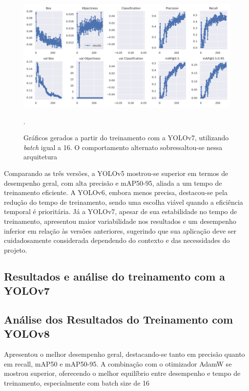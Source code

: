 \begin{figure}[!h]
    \centering
    \begin{minipage}{1\linewidth}
    \centering
    \captionsetup{justification=centering,margin=0.5cm,font=small}
    \includegraphics[width=1\linewidth]{img/cap6/results-yolov7-batch-16.png}
    \caption{Gráficos gerados a partir do treinamento com a YOLOv7, utilizando \textit{batch} igual a 16. O comportamento alternato sobressaltou-se nessa arquitetura}.
    \label{fig:yolov5batch16}
    \end{minipage}
\end{figure}

Comparando as três versões, a YOLOv5 mostrou-se superior em termos de desempenho geral, com alta precisão e mAP50-95, aliada a um tempo de treinamento eficiente. A YOLOv6, embora menos precisa, destacou-se pela redução do tempo de treinamento, sendo uma escolha viável quando a eficiência temporal é prioritária. Já a YOLOv7, apesar de sua estabilidade no tempo de treinamento, apresentou maior variabilidade nos resultados e um desempenho inferior em relação às versões anteriores, sugerindo que sua aplicação deve ser cuidadosamente considerada dependendo do contexto e das necessidades do projeto.

\subsection{Resultados e análise do treinamento com a YOLOv7}

\subsection{Análise dos Resultados do Treinamento com YOLOv8}

Apresentou o melhor desempenho geral, destacando-se tanto em precisão quanto em recall, mAP50 e mAP50-95. A combinação com o otimizador AdamW se mostrou superior, oferecendo o melhor equilíbrio entre desempenho e tempo de treinamento, especialmente com batch size de 16

